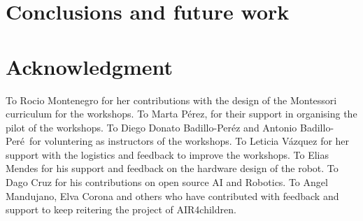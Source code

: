 \documentclass[conference]{IEEEtran}
\begin{document}
\section{Conclusions and future work}
\lipsum[1]


\section*{Acknowledgment}
To Rocio Montenegro for her contributions with the design of the Montessori curriculum for the workshops.
To Marta P\'erez, for their support in organising the pilot of the workshops.
To Diego Donato Badillo-Per\'ez and Antonio Badillo-Per\'e\ for voluntering as instructors of the workshops.
To Leticia V\'azquez for her support with the logistics and feedback to improve the workshops.
To Elias Mendes for his support and feedback on the hardware design of the robot.
To Dago Cruz for his contributions on open source AI and Robotics.
To Angel Mandujano, Elva Corona and others who have contributed with feedback and support to keep reitering the project of AIR4children. 



\end{document}
